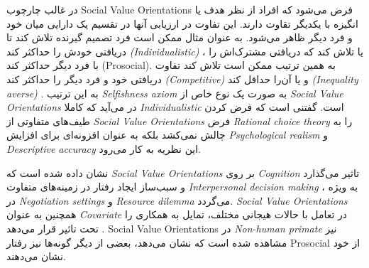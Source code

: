 در غالب چارچوب
\gls{Social Value Orientations}
فرض می‌شود که افراد از نظر هدف یا انگیزه با یکدیگر تقاوت دارند. این
تفاوت در ارزیابی آنها در تقسیم یک دارایی میان خود
و فرد دیگر ظاهر می‌شود. به عنوان مثال ممکن است فرد تصمیم گیرنده
تلاش کند تا دریافتی خودش را حداکثر کند
\textit{
    \!(\gls{Individualistic})
}،
یا تلاش کند که دریافتی مشترک‌اش را با فرد دیگر حداکثر کند
\!(\gls{Prosocial}).
به همین ترتیب ممکن است تلاش کند تفاوت دریافتی خود و فرد دیگر را حداکثر کند
\textit{
    \!(\gls{Competitive})
}
و
یا آن‌را حداقل کند
\textit{
    \!(\gls{Inequality averse})
}.
به این ترتیب
\textit{
    \gls{Selfishness axiom}
}
به صورت یک نوع خاص از
\textit{
    \gls{Social Value Orientations}
}
در می‌آید که کاملا
\textit{
    \gls{Individualistic}
}
است. گفتنی است که فرض کردن طیف‌های متفاوتی از
\textit{
    \gls{Social Value Orientations}
}
فرض
\textit{
    \gls{Rational choice theory}
}
را به چالش نمی‌کشد بلکه به عنوان افزونه‌ای برای افزایش
\textit{
    \gls{Psychological realism}
}
و
\textit{
    \gls{Descriptive accuracy}
}
این نظریه به کار می‌رود.

نشان داده شده است که
\textit{
    \gls{Social Value Orientations}
}
بر روی
\textit{
    \gls{Cognition}
}
تاثیر می‌گذارد و سبب‌ساز ایجاد رفتار در زمینه‌های متفاوت
\textit{
    \gls{Interpersonal decision making}
}،
به ویژه در
\textit{
    \gls{Negotiation settings}
}
\!\citep{dedreuShareShareAlike1998}
و
\textit{
    \gls{Resource dilemma}
}
\!\citep{rochCognitiveLoadEquality2000,rochEffectsEnvironmentalUncertainty1997,samuelsonMultiattributeEvaluationApproach1993}
می‌گردد.
\textit{
    \gls{Social Value Orientations}
}
همچنین به عنوان
\textit{
    \gls{Covariate}
}
در تعامل با حالات  هیجانی مختلف، تمایل به همکاری را تحت تاثیر قرار می‌دهد
\citep{zeelenbergEmotionSpecificityDecision2008}.
\gls{Social Value Orientations}
در
\textit{
    \gls{Non-human primate}
}
نیز مشاهده شده است که  نشان می‌دهد، بعضی از دیگر گونه‌ها نیز رفتار
\gls{Prosocial}
از خود نشان می‌دهند.

